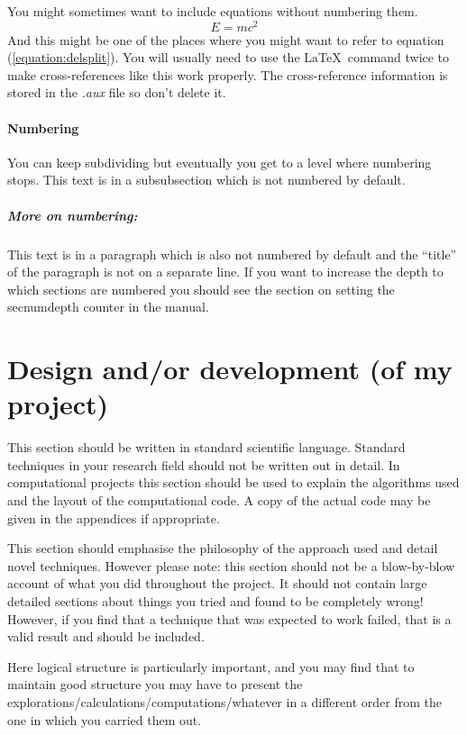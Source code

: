 \documentclass[12pt,a4paper]{report}
\begin{document}
You might sometimes want to include equations without numbering them.
\[
  E=mc^{2}
\]
And this might be one of the places where you might want to refer to
equation (\ref{equation:delsplit}). You will usually need to use the
\LaTeX\ command twice to make cross-references like this work properly.
The cross-reference information is stored in the \emph{.aux} file so
don't delete it.

\subsubsection{Numbering}
You can keep subdividing but eventually you get to a level where
numbering stops. This text is in a subsubsection which is not numbered
by default.


\paragraph{More on numbering:}

This text is in a paragraph which is also not numbered by default and
the ``title'' of the paragraph is not on a separate line.
If you want to increase the depth to which sections are numbered you
should see the section on setting the secnumdepth counter in the manual. 


\chapter{Design and/or development (of my project)}

This section should be written in standard scientific
language. Standard techniques in your research field should not be
written out in detail. In computational projects this section should
be used to explain the algorithms used and the layout of the
computational code. A copy of the actual code may be given in the
appendices if appropriate.

This section should emphasise the philosophy of the approach used and
detail novel techniques. However please note: this section should not
be a blow-by-blow account of what you did throughout the project. It
should not contain large detailed sections about things you tried and
found to be completely wrong! However, if you find that a technique
that was expected to work failed, that is a valid result and should be
included.

Here logical structure is particularly important, and you may find
that to maintain good structure you may have to present the
explorations/calculations/computations/whatever in a different order
from the one in which you carried them out.
\end{document}
